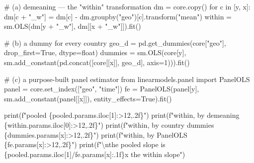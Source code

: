 \documentclass[
  letterpaper,
  10pt,
  twoside,
  openright,
  numbers=noenddot,
  chapterprefix=true]{scrbook}
\newenvironment{Shaded}{}{}
\newcommand{\BuiltInTok}[1]{\textcolor[rgb]{0.84,0.23,0.29}{#1}}
\newcommand{\CharTok}[1]{\textcolor[rgb]{0.01,0.18,0.38}{#1}}
\newcommand{\CommentTok}[1]{\textcolor[rgb]{0.42,0.45,0.49}{#1}}
\newcommand{\ControlFlowTok}[1]{\textcolor[rgb]{0.84,0.23,0.29}{#1}}
\newcommand{\DecValTok}[1]{\textcolor[rgb]{0.00,0.36,0.77}{#1}}
\newcommand{\ImportTok}[1]{\textcolor[rgb]{0.01,0.18,0.38}{#1}}
\newcommand{\KeywordTok}[1]{\textcolor[rgb]{0.84,0.23,0.29}{#1}}
\newcommand{\NormalTok}[1]{\textcolor[rgb]{0.14,0.16,0.18}{#1}}
\newcommand{\OperatorTok}[1]{\textcolor[rgb]{0.14,0.16,0.18}{#1}}
\newcommand{\SpecialCharTok}[1]{\textcolor[rgb]{0.00,0.36,0.77}{#1}}
\newcommand{\SpecialStringTok}[1]{\textcolor[rgb]{0.01,0.18,0.38}{#1}}
\newcommand{\StringTok}[1]{\textcolor[rgb]{0.01,0.18,0.38}{#1}}
\newcommand{\VariableTok}[1]{\textcolor[rgb]{0.89,0.38,0.04}{#1}}
\begin{document}
\label{check-within}
\begin{Shaded}
\begin{Highlighting}[]
\CommentTok{\# (a) demeaning — the "within" transformation}
\NormalTok{dm }\OperatorTok{=}\NormalTok{ core.copy()}
\ControlFlowTok{for}\NormalTok{ c }\KeywordTok{in}\NormalTok{ [y, x]:}
\NormalTok{    dm[c }\OperatorTok{+} \StringTok{"\_w"}\NormalTok{] }\OperatorTok{=}\NormalTok{ dm[c] }\OperatorTok{{-}}\NormalTok{ dm.groupby(}\StringTok{"geo"}\NormalTok{)[c].transform(}\StringTok{"mean"}\NormalTok{)}
\NormalTok{within }\OperatorTok{=}\NormalTok{ sm.OLS(dm[y }\OperatorTok{+} \StringTok{"\_w"}\NormalTok{], dm[[x }\OperatorTok{+} \StringTok{"\_w"}\NormalTok{]]).fit()}

\CommentTok{\# (b) a dummy for every country}
\NormalTok{geo\_d }\OperatorTok{=}\NormalTok{ pd.get\_dummies(core[}\StringTok{"geo"}\NormalTok{], drop\_first}\OperatorTok{=}\VariableTok{True}\NormalTok{, dtype}\OperatorTok{=}\BuiltInTok{float}\NormalTok{)}
\NormalTok{dummies }\OperatorTok{=}\NormalTok{ sm.OLS(core[y], sm.add\_constant(pd.concat([core[[x]], geo\_d], axis}\OperatorTok{=}\DecValTok{1}\NormalTok{))).fit()}

\CommentTok{\# (c) a purpose{-}built panel estimator}
\ImportTok{from}\NormalTok{ linearmodels.panel }\ImportTok{import}\NormalTok{ PanelOLS}
\NormalTok{panel }\OperatorTok{=}\NormalTok{ core.set\_index([}\StringTok{"geo"}\NormalTok{, }\StringTok{"time"}\NormalTok{])}
\NormalTok{fe }\OperatorTok{=}\NormalTok{ PanelOLS(panel[y], sm.add\_constant(panel[[x]]), entity\_effects}\OperatorTok{=}\VariableTok{True}\NormalTok{).fit()}

\BuiltInTok{print}\NormalTok{(}\SpecialStringTok{f"pooled                        }\SpecialCharTok{\{}\NormalTok{pooled}\SpecialCharTok{.}\NormalTok{params}\SpecialCharTok{.}\NormalTok{iloc[}\DecValTok{1}\NormalTok{]}\SpecialCharTok{:\textgreater{}12,.2f\}}\SpecialStringTok{"}\NormalTok{)}
\BuiltInTok{print}\NormalTok{(}\SpecialStringTok{f"within, by demeaning          }\SpecialCharTok{\{}\NormalTok{within}\SpecialCharTok{.}\NormalTok{params}\SpecialCharTok{.}\NormalTok{iloc[}\DecValTok{0}\NormalTok{]}\SpecialCharTok{:\textgreater{}12,.2f\}}\SpecialStringTok{"}\NormalTok{)}
\BuiltInTok{print}\NormalTok{(}\SpecialStringTok{f"within, by country dummies    }\SpecialCharTok{\{}\NormalTok{dummies}\SpecialCharTok{.}\NormalTok{params[x]}\SpecialCharTok{:\textgreater{}12,.2f\}}\SpecialStringTok{"}\NormalTok{)}
\BuiltInTok{print}\NormalTok{(}\SpecialStringTok{f"within, by PanelOLS           }\SpecialCharTok{\{}\NormalTok{fe}\SpecialCharTok{.}\NormalTok{params[x]}\SpecialCharTok{:\textgreater{}12,.2f\}}\SpecialStringTok{"}\NormalTok{)}
\BuiltInTok{print}\NormalTok{(}\SpecialStringTok{f"}\CharTok{\textbackslash{}n}\SpecialStringTok{the pooled slope is }\SpecialCharTok{\{}\NormalTok{pooled}\SpecialCharTok{.}\NormalTok{params}\SpecialCharTok{.}\NormalTok{iloc[}\DecValTok{1}\NormalTok{]}\OperatorTok{/}\NormalTok{fe}\SpecialCharTok{.}\NormalTok{params[x]}\SpecialCharTok{:.1f\}}\SpecialStringTok{x the within slope"}\NormalTok{)}
\end{Highlighting}
\end{Shaded}
\end{document}
